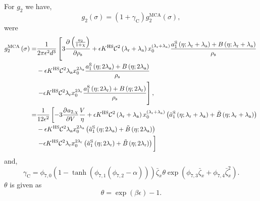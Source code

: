 \documentclass[english]{../thermomemo/thermomemo}
\newcommand*{\pd}[3][]{\frac{\partial^{#1}#2}{\partial{#3}^{#1}}}%
\newcommand*{\lb}{\left(}
\newcommand*{\rb}{\right)}
\newcommand{\mca}{\text{MCA}\xspace}
\newcommand{\hs}{\text{HS}\xspace}
\newcommand{\seg}{\ensuremath{\text{s}}\xspace}
\newcommand{\lama}{\ensuremath{{\lambda_{\text{a}}}}\xspace}
\newcommand{\lamr}{\ensuremath{{\lambda_{\text{r}}}}\xspace}
\newcommand{\aS}{\ensuremath{a_{1}^{\text{S}}}\xspace}
\newcommand{\aSt}{\ensuremath{\tilde{a}_{1}^{\text{S}}}\xspace}
\newcommand{\Bt}{\ensuremath{\tilde{B}}\xspace}
\newcommand{\gamc}{\ensuremath{\gamma_{\text{C}}}\xspace}
\newcommand{\zb}{\bar{\zeta}}
\begin{document}
For $g_2$ we have,
\begin{equation}
  \label{eq:g_2}
  g_2 \lb \sigma \rb = \lb 1 + \gamc \rb g_2^\mca \lb \sigma \rb,
\end{equation}
were
\begin{align}
  \label{eq:g_2_mca}
  g_2^\mca \lb \sigma \rb =& \frac{1}{2 \pi \epsilon^2 d^3} \left[ 3 \pd{\lb\frac{a_2}{1+\chi}\rb}{\rho_\seg} + \epsilon K^\hs \mathcal{C}^2 \lb\lamr + \lama\rb x_0^{\lb\lamr + \lama\rb} \frac{\aS\lb \eta; \lamr + \lama\rb + B\lb\eta;\lamr + \lama \rb}{\rho_\seg} \right. \nonumber \\
                           & - \epsilon K^\hs \mathcal{C}^2 \lama x_0^{2\lama} \frac{\aS\lb \eta; 2\lama\rb + B\lb\eta;2\lama \rb}{\rho_\seg}  \nonumber \\
                           & \left. - \epsilon K^\hs \mathcal{C}^2 \lamr x_0^{2\lamr} \frac{\aS\lb \eta; 2\lamr\rb + B\lb\eta;2\lamr \rb}{\rho_\seg} \vphantom{\pd{\lb\frac{a_2}{1+\chi}\rb}{\rho_\seg}} \right],\\
  =& \frac{1}{12 \epsilon^2} \left[ -3 \pd{a_{2,\chi}}{V}\frac{V}{\eta} + \epsilon K^\hs \mathcal{C}^2 \lb\lamr + \lama\rb x_0^{\lb\lamr + \lama\rb} \lb\aSt\lb \eta; \lamr + \lama\rb + \Bt\lb\eta;\lamr + \lama \rb\rb \right. \nonumber \\
    &  - \epsilon K^\hs \mathcal{C}^2 \lama x_0^{2\lama} \lb\aSt\lb \eta; 2\lama\rb + \Bt\lb\eta;2\lama \rb\rb \nonumber \\
    &\left. - \epsilon K^\hs \mathcal{C}^2 \lamr x_0^{2\lamr} \lb\aSt\lb \eta; 2\lamr\rb + \Bt\lb\eta;2\lamr \rb\rb \vphantom{\pd{a_{2,\chi}}{V}\frac{V}{\eta}} \right]
\end{align}
and,
\begin{equation}
  \label{eq:gamma_C}
  \gamc = \phi_{7,0} \lb 1 - \tanh \lb \phi_{7,1} \lb \phi_{7,2} - \alpha\rb \rb\rb \zb_x \theta \exp \lb \phi_{7,3}\zb_x + \phi_{7,4} \zb_x^2 \rb.
\end{equation}
$\theta$ is given as
\begin{equation}
  \label{eq:theta}
  \theta = \exp \lb \beta \epsilon \rb - 1.
\end{equation}
\end{document}
